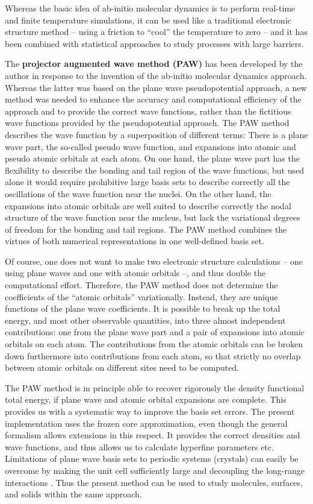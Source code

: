 \documentclass[final,12pt]{article}
\begin{document}
Whereas the basic idea of ab-initio molecular dynamics is to perform
real-time and finite temperature simulations, it can be used like a
traditional electronic structure method -- using a friction to
``cool'' the temperature to zero -- and it has been combined
with statistical approaches to study processes with large barriers.

The {\bf projector augmented wave method (PAW)}
\cite{bloechl94_prb50_17953} has been developed by the author in
response to the invention of the ab-initio molecular dynamics
approach. Whereas the latter was based on the plane wave
pseudopotential approach, a new method was needed to enhance the
accuracy and computational efficiency of the approach and to provide
the correct wave functions, rather than the fictitious wave functions
provided by the pseudopotential approach.  The PAW method describes
the wave function by a superposition of different terms: There is a
plane wave part, the so-called pseudo wave function, and expansions
into atomic and pseudo atomic orbitals at each atom. On one hand, the
plane wave part has the flexibility to describe the bonding and tail
region of the wave functions, but used alone it would require
prohibitive large basis sets to describe correctly all the
oscillations of the wave function near the nuclei. On the other hand,
the expansions into atomic orbitals are well suited to describe
correctly the nodal structure of the wave function near the nucleus,
but lack the variational degrees of freedom for the bonding and tail
regions.  The PAW method combines the virtues of both numerical
representations in one well-defined basis set.

Of course, one does not want to make two electronic structure
calculations  -- one using plane waves and one with atomic
orbitals --, and thus double the computational effort. Therefore, the
PAW method does not determine the coefficients of the ``atomic orbitals''
variationally. Instead, they are unique functions of the plane wave
coefficients. It is possible to break up the total energy, and most
other observable quantities, into three almost independent
contributions: one from the plane wave part and a pair of expansions
into atomic orbitals on each atom. The contributions from the atomic
orbitals can be broken down furthermore into contributions from each atom,
so that strictly no overlap between atomic orbitals on different sites
need to be computed.

The PAW method is in principle able to recover rigorously the density
functional total energy, if plane wave and atomic orbital expansions are
complete. This provides us with a systematic way to improve the basis set
errors.  The present implementation uses the frozen core approximation, even
though the general formalism allows extensions in this respect. It provides
the correct densities and wave functions, and thus allows us to calculate
hyperfine parameters etc.  Limitations of plane wave basis sets to periodic
systems (crystals) can easily be overcome by making the unit cell sufficiently
large and decoupling the long-range interactions
\cite{bloechl95_jcp103_7422}. Thus the present method can be used to study
molecules, surfaces, and solids within the same approach.
\end{document}
